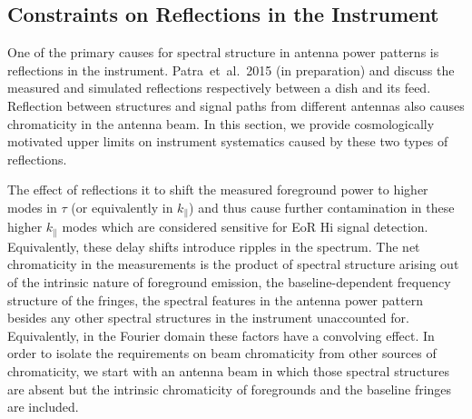 \documentclass[preprint2,iop,numberedappendix,twocolappendix,appendixfloats]{emulateapj}
\begin{document}
\subsection{Constraints on Reflections in the Instrument}\label{sec:constraints-reflectometry}

One of the primary causes for spectral structure in antenna power patterns is reflections in the instrument. Patra~et~al.~2015 (in preparation) and \citet{ewa16} discuss the measured and simulated reflections respectively between a dish and its feed. Reflection between structures and signal paths from different antennas also causes chromaticity in the antenna beam. In this section, we provide cosmologically motivated upper limits on instrument systematics caused by these two types of reflections. %

The effect of reflections it to shift the measured foreground power to higher modes in $\tau$ (or equivalently in $k_\parallel$) and thus cause further contamination in these higher $k_\parallel$ modes which are considered sensitive for EoR H{\sc i} signal detection. Equivalently, these delay shifts introduce ripples in the spectrum. The net chromaticity in the measurements is the product of spectral structure arising out of the intrinsic nature of foreground emission, the baseline-dependent frequency structure of the fringes, the spectral features in the antenna power pattern besides any other spectral structures in the instrument unaccounted for. Equivalently, in the Fourier domain these factors have a convolving effect. In order to isolate the requirements on beam chromaticity from other sources of chromaticity, we start with an antenna beam in which those spectral structures are absent but the intrinsic chromaticity of foregrounds and the baseline fringes are included. 

\end{document}
